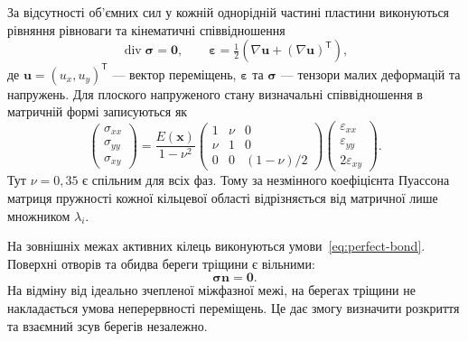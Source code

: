 За відсутності об'ємних сил у кожній однорідній частині пластини виконуються рівняння рівноваги та кінематичні співвідношення
\begin{equation}
 \operatorname{div}\boldsymbol\sigma=\boldsymbol 0,
 \qquad
 \boldsymbol\varepsilon=
 \tfrac12\left(\nabla\boldsymbol u+(\nabla\boldsymbol u)^{\mathsf T}\right),
 \label{eq:problem-equilibrium}
\end{equation}
де $\boldsymbol u=(u_x,u_y)^{\mathsf T}$ --- вектор переміщень, $\boldsymbol\varepsilon$ та $\boldsymbol\sigma$ --- тензори малих деформацій та напружень. Для плоского напруженого стану визначальні співвідношення в матричній формі записуються як
\begin{equation}
 \begin{pmatrix}
 \sigma_{xx}\\ \sigma_{yy}\\ \sigma_{xy}
 \end{pmatrix}
 =
 \frac{E(\boldsymbol x)}{1-\nu^2}
 \begin{pmatrix}
 1&\nu&0\\
 \nu&1&0\\
 0&0&(1-\nu)/2
 \end{pmatrix}
 \begin{pmatrix}
 \varepsilon_{xx}\\ \varepsilon_{yy}\\ 2\varepsilon_{xy}
 \end{pmatrix}.
 \label{eq:problem-plane-stress}
\end{equation}
Тут $\nu=0{,}35$ є спільним для всіх фаз. Тому за незмінного коефіцієнта Пуассона матриця пружності кожної кільцевої області відрізняється від матричної лише множником $\lambda_i$.

На зовнішніх межах активних кілець виконуються умови~\eqref{eq:perfect-bond}. Поверхні отворів та обидва береги тріщини є вільними:
\begin{equation}
 \boldsymbol\sigma\boldsymbol n=\boldsymbol 0.
 \label{eq:problem-free-boundary}
\end{equation}
На відміну від ідеально зчепленої міжфазної межі, на берегах тріщини не накладається умова неперервності переміщень. Це дає змогу визначити розкриття та взаємний зсув берегів незалежно.

